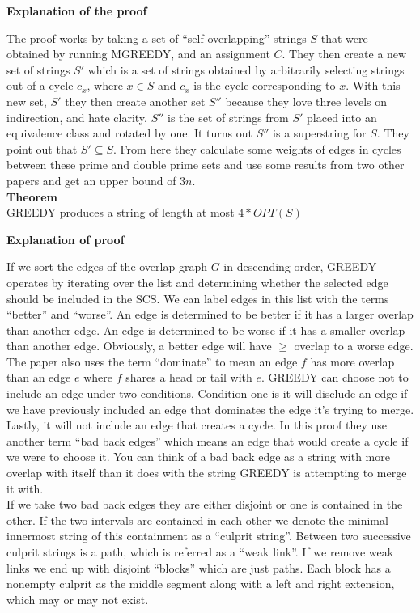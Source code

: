 \documentclass[letterpaper,11pt,titlepage]{article}
\begin{document}
\textbf{Explanation of the proof}

The proof works by taking a set of ``self overlapping'' strings $S$ that were obtained by running MGREEDY, and an assignment $C$. They then create a new set of strings $S'$ which is a set of strings obtained by arbitrarily selecting strings out of a cycle $c_x$, where $x \in S$ and $c_x$ is the cycle corresponding to $x$. With this new set, $S'$ they then create another set $S''$ because they love three levels on indirection, and hate clarity. $S''$ is the set of strings from $S'$ placed into an equivalence class and rotated by one. It turns out $S''$ is a superstring for $S$. They point out that $S' \subseteq S$. From here they calculate some weights of edges in cycles between these prime and double prime sets and use some results from two other papers and get an upper bound of $3n$.\\

\textbf{Theorem}\\
GREEDY produces a string of length at most $4 * OPT(S)$

\textbf{Explanation of proof}

If we sort the edges of the overlap graph $G$ in descending order, GREEDY operates by iterating over the list and determining whether the selected edge should be included in the SCS. We can label edges in this list with the terms ``better'' and ``worse''. An edge is determined to be better if it has a larger overlap than another edge. An edge is determined to be worse if it has a smaller overlap than another edge. Obviously, a better edge will have $\geq$ overlap to a worse edge. The paper also uses the term ``dominate'' to mean an edge $f$ has more overlap than an edge $e$ where $f$ shares a head or tail with $e$. GREEDY can choose not to include an edge under two conditions. Condition one is it will disclude an edge if we have previously included an edge that dominates the edge it's trying to merge. Lastly, it will not include an edge that creates a cycle. In this proof they use another term ``bad back edges'' which means an edge that would create a cycle if we were to choose it. You can think of a bad back edge as a string with more overlap with itself than it does with the string GREEDY is attempting to merge it with.\\

If we take two bad back edges they are either disjoint or one is contained in the other. If the two intervals are contained in each other we denote the minimal innermost string of this containment as a ``culprit string''. Between two successive culprit strings is a path, which is referred as a ``weak link''. If we remove weak links we end up with disjoint ``blocks'' which are just paths. Each block has a nonempty culprit as the middle segment along with a left and right extension, which may or may not exist.
\end{document}
